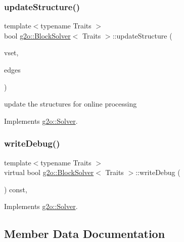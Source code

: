 \subsubsection{\texorpdfstring{update\+Structure()}{updateStructure()}}
{\footnotesize\ttfamily template$<$typename Traits $>$ \\
bool \mbox{\hyperlink{classg2o_1_1_block_solver}{g2o\+::\+Block\+Solver}}$<$ Traits $>$\+::update\+Structure (\begin{DoxyParamCaption}\item[{const std\+::vector$<$ \mbox{\hyperlink{classg2o_1_1_hyper_graph_1_1_vertex}{Hyper\+Graph\+::\+Vertex}} $\ast$$>$ \&}]{vset,  }\item[{const \mbox{\hyperlink{classg2o_1_1_hyper_graph_a5e2970e236c0dcb4eff7c205d7b6b4ae}{Hyper\+Graph\+::\+Edge\+Set}} \&}]{edges }\end{DoxyParamCaption})\hspace{0.3cm}{\ttfamily [virtual]}}

update the structures for online processing 

Implements \mbox{\hyperlink{classg2o_1_1_solver_aeca71878e37081b6138f90ac60ec1f89}{g2o\+::\+Solver}}.

\mbox{\label{classg2o_1_1_block_solver_aab81798b80dcb6c4182fa1d510914234}} 
\subsubsection{\texorpdfstring{write\+Debug()}{writeDebug()}}
{\footnotesize\ttfamily template$<$typename Traits $>$ \\
virtual bool \mbox{\hyperlink{classg2o_1_1_block_solver}{g2o\+::\+Block\+Solver}}$<$ Traits $>$\+::write\+Debug (\begin{DoxyParamCaption}{ }\end{DoxyParamCaption}) const\hspace{0.3cm}{\ttfamily [inline]}, {\ttfamily [virtual]}}



Implements \mbox{\hyperlink{classg2o_1_1_solver_a0f6f14940eccea0f9bf9e2ea144c9b4d}{g2o\+::\+Solver}}.



\subsection{Member Data Documentation}
\mbox{\label{classg2o_1_1_block_solver_aafddeb1d0a4218fc9c3c77169e20f81a}} 
